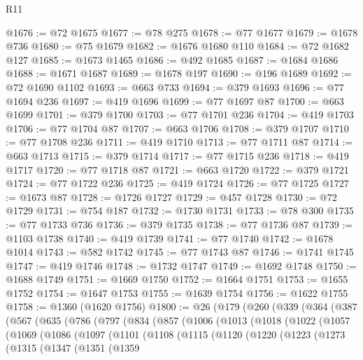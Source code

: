 \begin{lexlean}{R11}
\begin{coremodule}
@1676 := @72 @1675
@1677 := @78 @275
@1678 := @77 @1677
@1679 := @1678 @736
@1680 := @75 @1679
@1682 := @1676 @1680 @110
@1684 := @72 @1682 @127
@1685 := @1673 @1465
@1686 := @492 @1685
@1687 := @1684 @1686
@1688 := @1671 @1687
@1689 := @1678 @197
@1690 := @196 @1689
@1692 := @72 @1690 @1102
@1693 := @663 @733
@1694 := @379 @1693
@1696 := @77 @1694 @236
@1697 := @419 @1696
@1699 := @77 @1697 @87
@1700 := @663 @1699
@1701 := @379 @1700
@1703 := @77 @1701 @236
@1704 := @419 @1703
@1706 := @77 @1704 @87
@1707 := @663 @1706
@1708 := @379 @1707
@1710 := @77 @1708 @236
@1711 := @419 @1710
@1713 := @77 @1711 @87
@1714 := @663 @1713
@1715 := @379 @1714
@1717 := @77 @1715 @236
@1718 := @419 @1717
@1720 := @77 @1718 @87
@1721 := @663 @1720
@1722 := @379 @1721
@1724 := @77 @1722 @236
@1725 := @419 @1724
@1726 := @77 @1725
@1727 := @1673 @87
@1728 := @1726 @1727
@1729 := @457 @1728
@1730 := @72 @1729
@1731 := @754 @187
@1732 := @1730 @1731
@1733 := @78 @300
@1735 := @77 @1733 @736
@1736 := @379 @1735
@1738 := @77 @1736 @87
@1739 := @1103 @1738
@1740 := @419 @1739
@1741 := @77 @1740
@1742 := @1678 @1014
@1743 := @582 @1742
@1745 := @77 @1743 @87
@1746 := @1741 @1745
@1747 := @419 @1746
@1748 := @1732 @1747
@1749 := @1692 @1748
@1750 := @1688 @1749
@1751 := @1669 @1750
@1752 := @1664 @1751
@1753 := @1655 @1752
@1754 := @1647 @1753
@1755 := @1639 @1754
@1756 := @1622 @1755
@1758 := @1360 (@1620 @1756)
@1800 := @26
    (@179
      (@260
        (@339
          (@364
            (@387
              (@567
                (@635
                  (@786
                    (@797
                      (@834
                        (@857
                          (@1006
                            (@1013
                              (@1018
                                (@1022
                                  (@1057
                                    (@1069
                                      (@1086
                                        (@1097
                                          (@1101
                                            (@1108
                                              (@1115
                                                (@1120
                                                  (@1220
                                                    (@1223
                                                      (@1273
                                                        (@1315
                                                          (@1347
                                                            (@1351
                                                              (@1359

\end{coremodule}
\end{lexlean}
